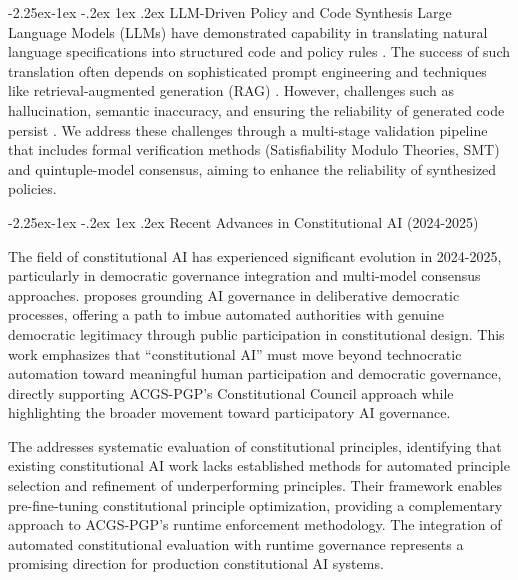 \documentclass[manuscript,screen,9pt]{acmart}
\makeatletter
\renewcommand\subsection{\@startsection{subsection}{2}{\z@}%
  {-2.25ex\@plus -1ex \@minus -.2ex}%
  {1ex \@plus .2ex}%
  {\normalfont\large\bfseries}}
\makeatother
\begin{document}
\subsection{LLM-Driven Policy and Code Synthesis}
\label{subsec:related_llm_synthesis}
Large Language Models (LLMs) have demonstrated capability in translating natural language specifications into structured code and policy rules \cite{Almulla2024EmergenceLLMPolicy, ResearchGate2025AutoPAC, Li2025VeriCoder}. The success of such translation often depends on sophisticated prompt engineering and techniques like retrieval-augmented generation (RAG) \cite{AnalyticsVidhya2024PromptingTechniques, arXiv2025FutureWorkRAG}. However, challenges such as hallucination, semantic inaccuracy, and ensuring the reliability of generated code persist \cite{AAAI2025CodeHalu, Taeihagh2025Governing}. We address these challenges through a multi-stage validation pipeline that includes formal verification methods (Satisfiability Modulo Theories, SMT) and quintuple-model consensus, aiming to enhance the reliability of synthesized policies.

\subsection{Recent Advances in Constitutional AI (2024-2025)}
\label{subsec:recent_constitutional_ai}

The field of constitutional AI has experienced significant evolution in 2024-2025, particularly in democratic governance integration and multi-model consensus approaches. \citet{Abiri2024PublicConstitutionalAI} proposes grounding AI governance in deliberative democratic processes, offering a path to imbue automated authorities with genuine democratic legitimacy through public participation in constitutional design. This work emphasizes that ``constitutional AI'' must move beyond technocratic automation toward meaningful human participation and democratic governance, directly supporting ACGS-PGP's Constitutional Council approach while highlighting the broader movement toward participatory AI governance.

The \citet{C3AI2025Framework} addresses systematic evaluation of constitutional principles, identifying that existing constitutional AI work lacks established methods for automated principle selection and refinement of underperforming principles. Their framework enables pre-fine-tuning constitutional principle optimization, providing a complementary approach to ACGS-PGP's runtime enforcement methodology. The integration of automated constitutional evaluation with runtime governance represents a promising direction for production constitutional AI systems.
\end{document}
